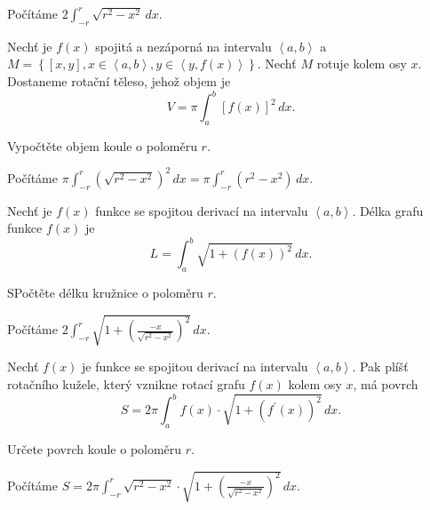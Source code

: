 \begin{reseni}
Počítáme $2\int_{-r}^r \sqrt{r^2-x^2}\, dx  $.
\end{reseni}

\begin{pozn}
    Nechť je $f(x)$ spojitá a nezáporná na intervalu $\left < a,b \right > $ a
    $M=\left \{ \left [ x,y \right ], x \in \left < a,b \right >, y \in \left < y, f(x) \right >    \right \} .$
    Nechť $M$ rotuje kolem osy $x$. Dostaneme rotační těleso, jehož objem je
    $$V=\pi \int _a^b \left [ f(x) \right ]^2 \, dx. $$
\end{pozn}

\begin{priklad}
Vypočtěte objem koule o poloměru $r$.
\end{priklad}

\begin{reseni}
Počítáme $\pi\int _{-r}^r(\sqrt{r^2-x^2} )^2 \, dx=\pi\int_{-r}^r(r^2-x^2)\, dx$.
\end{reseni}

\begin{pozn}
Nechť je $f(x)$ funkce se spojitou derivací na intervalu $\left < a,b \right > $. Délka
grafu funkce $f(x)$ je
$$L=\int_a^b \sqrt{1+(f(x))^2}\, dx. $$
\end{pozn}

\begin{priklad}
SPočtěte délku kružnice o poloměru $r$.
\end{priklad}

\begin{reseni}
Počítáme $2\int _{-r}^r \sqrt{1+\left ( \frac{-x}{\sqrt{r^2-x^2}} \right )^2 }\, dx.  $
\end{reseni}

\begin{pozn}
    Nechť $f(x)$ je funkce se spojitou derivací na intervalu $\left < a,b \right > .$
    Pak plíšť rotačního kužele, který vznikne rotací grafu $f(x)$ kolem osy $x$, má
   povrch
  $$S=2\pi\int_a^b f(x)\cdot \sqrt{1+(f^\prime(x))^2}\, dx. $$
\end{pozn}

\begin{priklad}
Určete povrch koule o poloměru $r$.
\end{priklad}

\begin{reseni}
Počítáme $S=2\pi\int_{-r}^r \sqrt{r^2-x^2}\cdot \sqrt{1+\left ( \frac{-x}{\sqrt{r^2-x^2} } \right )^2 } \, dx. $
\end{reseni}
